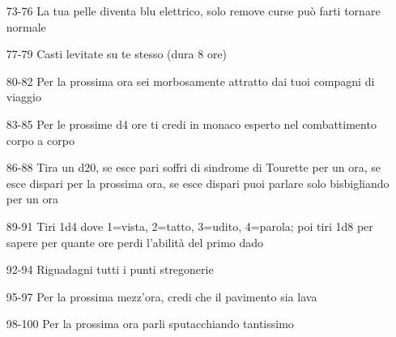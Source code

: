 \documentclass[10pt,a4paper]{article}
\begin{document}
\begin{itemize}
\item[73-76]La tua pelle diventa blu elettrico, solo remove curse pu\`o farti tornare normale
\item[77-79]Casti levitate su te stesso (dura 8 ore)
\item[80-82]Per la prossima ora sei morbosamente attratto dai tuoi compagni di viaggio
\item[83-85]Per le prossime d4 ore ti credi in monaco esperto nel combattimento corpo a corpo
\item[86-88]Tira un d20, se esce pari soffri di sindrome di Tourette per un ora, se esce dispari per la prossima ora, se esce dispari puoi parlare solo bisbigliando per un ora  
\item[89-91]Tiri 1d4 dove 1=vista, 2=tatto, 3=udito, 4=parola; poi tiri 1d8 per sapere per quante ore perdi l'abilit\`a del primo dado
\item[92-94]Riguadagni tutti i punti stregonerie 
\item[95-97] Per la prossima mezz'ora, credi che il pavimento sia lava
\item[98-100] Per la prossima ora parli sputacchiando tantissimo
\end{itemize}
\end{document}
